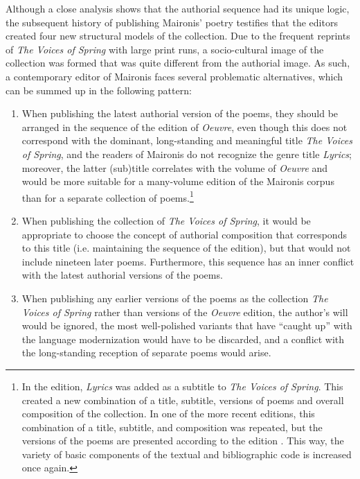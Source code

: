 \begin{paper}
Although a close analysis shows that the authorial sequence had its
unique logic, the subsequent history of publishing Maironis' poetry
testifies that the editors created four new structural models of the
collection. Due to the frequent reprints of \emph{The Voices of Spring}
with large print runs, a socio-cultural image of the collection was formed that was quite
different from the authorial image. As such, a contemporary
editor of Maironis faces several problematic alternatives, which can be
summed up in the following pattern:

\begin{enumerate}
\item When publishing the latest authorial version of the poems, they should
be arranged in the sequence of the \citeyear{maironis_maironio_1927} edition of \emph{Oeuvre}, even though this
does not correspond with the dominant, long-standing and meaningful title
\emph{The Voices of Spring}, and the readers of Maironis do not
recognize the genre title \emph{Lyrics}; moreover, the latter
(sub)title correlates with the volume of \emph{Oeuvre} and would be more
suitable for a many-volume edition of the Maironis corpus than for a
separate collection of poems.\footnote{In the \citeyear{maironis_pavasario_1952} edition,
  \emph{Lyrics} was added as a subtitle to \emph{The Voices of Spring}. This created a new combination of a title, subtitle, versions of poems
  and overall composition of the collection. In one of the more recent editions, this combination of a title, subtitle, and
  composition was repeated, but the versions of the poems are presented
  according to the \citeyear{maironis_maironio_1927} edition \citep{maironis_pavasario_2012}. This way, the variety of
  basic components of the textual and bibliographic code is increased
  once again.}

\item When publishing the collection of \emph{The Voices of Spring}, it would
be appropriate to choose the concept of authorial composition that
corresponds to this title (i.e. maintaining the sequence of the \citeyear{maironis_pavasario_1920} edition), but
that would not include nineteen later poems. Furthermore, this sequence has
an inner conflict with the latest authorial versions of the poems.

\item When publishing any earlier versions of the poems as the collection
\emph{The Voices of Spring} rather than versions of the \citeyear{maironis_maironio_1927}
\emph{Oeuvre} edition, the author's will would be ignored, the most
well-polished variants that have ``caught up'' with the language
modernization would have to be discarded, and a conflict with the
long-standing reception of separate poems would arise.
\end{enumerate}


\end{paper}
